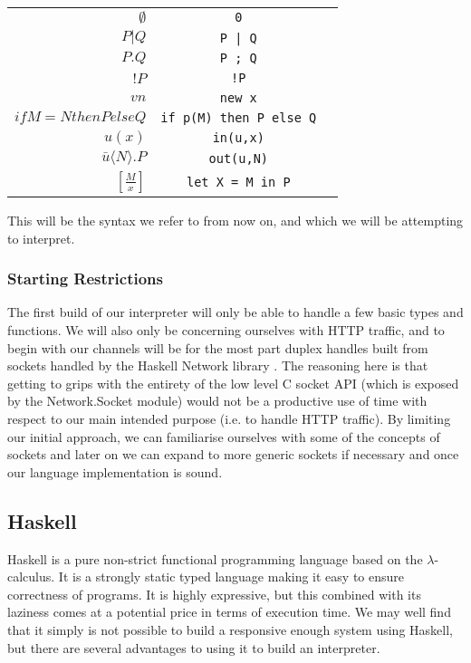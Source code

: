 \begin{table}[hc!]
    \begin{tabular}{r c l}
        $\emptyset$&\verb!0!\\
        $P|Q$& \verb!P | Q!\\
        $P.Q$& \verb!P ; Q!\\
        $!P$ & \verb?!P?\\
        $vn$& \verb!new x!\\
        $if M=N then P else Q $&\verb!if p(M) then P else Q! \\
        $u(x)$&\verb!in(u,x)! \\
        $\bar{u}\langle N \rangle .P$&\verb!out(u,N)! \\
        $\left[ \frac{M}{x} \right]$&\verb!let X = M in P!\\
    \end{tabular}
\end{table} 

This will be the syntax we refer to from now on, and which we will be attempting to interpret.

\subsubsection{Starting Restrictions}

The first build of our interpreter will only be able to handle a few basic types and functions. We will also only be concerning ourselves with HTTP traffic, and to begin with our channels will be for the most part duplex handles built from sockets \cite{wiki:sockets} handled by the Haskell Network library \cite{hack:network}. The reasoning here is that getting to grips with the entirety of the low level C socket API (which is exposed by the Network.Socket module) would not be a productive use of time with respect to our main intended purpose (i.e. to handle HTTP traffic).
By limiting our initial approach, we can familiarise ourselves with some of the concepts of
sockets and later on we can expand to more generic sockets if necessary and once our language implementation is sound.

\subsection{Haskell}

Haskell is a pure non-strict functional programming language based on the $\lambda$-calculus. It is a strongly static typed language making it easy to ensure correctness of programs. It is highly expressive, but this combined with its laziness comes at a potential price in terms of execution time. We may well find that it simply is not possible to build a responsive enough system using Haskell, but there are several advantages to using it to build an interpreter.

